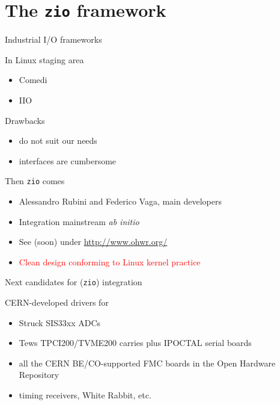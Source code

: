 \documentclass[compress,red]{beamer}
\begin{document}
\section{The \texttt{zio} framework}

\begin{frame}{Industrial I/O frameworks}

\pause
\begin{block}{In Linux staging area}
\begin{itemize}
\item Comedi
\item IIO
\end{itemize}
\end{block}

\pause
\begin{block}{Drawbacks}
\begin{itemize}
\item do not suit our needs
\item interfaces are cumbersome
\end{itemize}
\end{block}

\pause
\begin{block}{Then \texttt{zio} comes}
\begin{itemize}
\item Alessandro Rubini and Federico Vaga, main developers
\item Integration mainstream \emph{ab initio}
\item See (soon) under \url{http://www.ohwr.org/}
\item \textcolor{red}{Clean design conforming to Linux kernel practice}
\end{itemize}
\end{block}

\end{frame}

\begin{frame}{Next candidates for (\texttt{zio}) integration}

CERN-developed drivers for
\begin{itemize}
\pause
\item Struck SIS33xx ADCs
\pause
\item Tews TPCI200/TVME200 carries plus IPOCTAL serial boards
\pause
\item all the CERN BE/CO-supported FMC boards in the Open Hardware Repository
\pause
\item timing receivers, White Rabbit, etc.
\end{itemize}
\end{frame}
\end{document}
